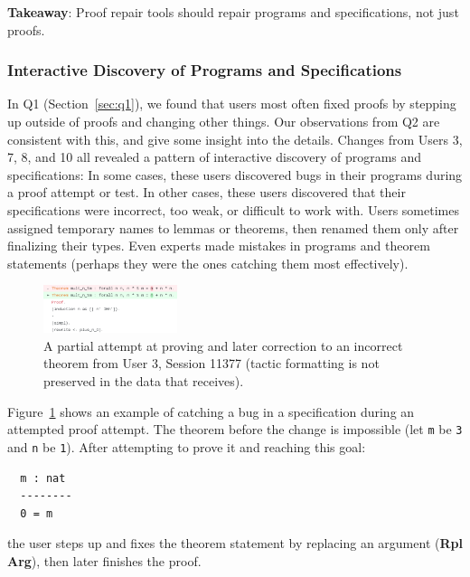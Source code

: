 \begin{displayquote}
  \textbf{Takeaway}:
  Proof repair tools should repair programs and specifications,
  not just proofs.
\end{displayquote}

\subsubsection{Interactive Discovery of Programs and Specifications}
\label{sec:pat4}

In Q1 (Section~\ref{sec:q1}), we found that users most often fixed
proofs by stepping up outside of proofs and changing other things.
Our observations from Q2 are consistent with this,
and give some insight into the details.
Changes from Users 3, 7, 8, and 10 all revealed a pattern of interactive
discovery of programs and specifications:
In some cases, these users discovered bugs in their programs during a
proof attempt or test.
In other cases, these users discovered that their specifications were
incorrect, too weak, or difficult to work with.
Users sometimes assigned temporary names to lemmas or theorems,
then renamed them only after finalizing their types.
Even experts made mistakes in programs and theorem statements
(perhaps they were the ones catching them most effectively).

\begin{figure}
  \includegraphics[width=0.35\textwidth]{maintenance/fig/bad.png}
  \caption{A partial attempt at proving and later correction to an incorrect theorem from User 3, Session 11377 (tactic formatting is not preserved in the data
that \toolname receives).}
  \label{fig:bad}
\end{figure}

Figure~\ref{fig:bad} shows an example of catching a bug in a specification
during an attempted proof attempt. The theorem
before the change is impossible (let \lstinline{m} be \lstinline{3} 
and \lstinline{n} be \lstinline{1}).
After attempting to prove it and reaching this goal:

\begin{lstlisting}
  m : nat
  --------
  0 = m
\end{lstlisting}
the user steps up and fixes the theorem statement by replacing an argument
(\textbf{Rpl} \textbf{Arg}), then later finishes the proof.

